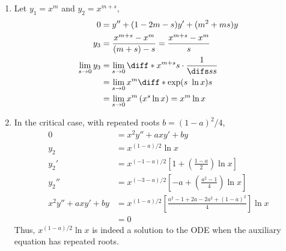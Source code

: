 \begin{enumerate}
\begin{enumerate}
              \item Let $ y_{1} = x^{m} $ and $ y_{2} = x^{m+s} $,
                    \begin{align}
                        0                   & = y'' + (1 -2m - s)y' + (m^{2} + ms)y \\
                        y_{3}               & = \frac{x^{m+s} - x^{m}}{(m+s) - s}
                        = \frac{x^{m+s} - x^{m}}{s}                                 \\
                        \lim_{s \to 0}y_{3} & = \lim_{s \to 0} \diff*{x^{m+s}}{s}
                        \cdot \frac{1}{\difs ss}                                    \\
                                            & = \lim_{s \to 0} x^{m}\diff*{\exp(s
                        \ \ln x)}{s}                                                \\
                                            & = \lim_{s \to 0} x^{m}\left( x^{s}
                        \ln x \right) = x^{m}\ln x
                    \end{align}

              \item In the critical case, with repeated roots $ b = (1-a)^{2}/4 $,
                    \begin{align}
                        0                    & = x^{2}y'' + axy' + by            \\
                        y_{2}                & = x^{(1-a)/2}\ln x                \\
                        y_{2}'               & = x^{(-1-a)/2} \left[ 1
                        + \left( \frac{1-a}{2} \right)\ln x \right]              \\
                        y_{2}''              & = x^{(-3-a)/2} \left[ -a
                        + \left( \frac{a^{2} - 1}{4} \right) \ln x \right]       \\
                        x^{2}y'' + axy' + by & = x^{(1-a)/2} \left[  \frac{a^{2}
                        - 1 + 2a - 2a^{2} + (1-a)^{2}}{4} \right] \ln x          \\
                                             & = 0
                    \end{align}
                    Thus, $ x^{(1-a)/2}\ln x $ is indeed a solution to the ODE when
                    the auxiliary equation has repeated roots.


\end{enumerate}
\end{enumerate}
